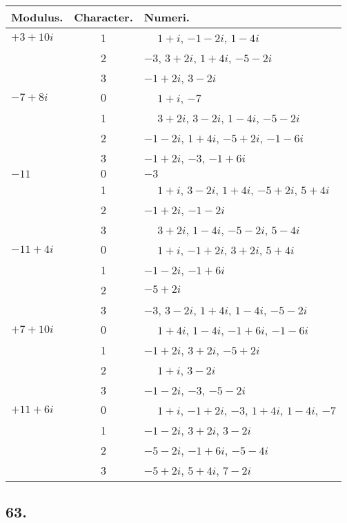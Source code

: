 \documentclass[twoside,12pt, showframe]{memoir}
\begin{document}
\begin{center}
\begin{tabular}{l|c|l}
Modulus. & Character. & Numeri. \\
\hline
\(+3+10 i\) & 1 & \(\phantom{+}1+i\), \(-1-2 i\), \(1-4 i\) \\
 & 2 & \(-3\), \(3+2 i\), \(1+4 i\), \(-5-2 i\) \\
 & 3 & \(-1+2 i\), \(3-2 i\) \\
\(-7+8 i\) & \(0\) & \(\phantom{+}1+i\), \(-7\) \\
 & 1 & \(\phantom{+}3+2 i\), \(3-2 i\), \(1-4 i\), \(-5-2 i\) \\
 & 2 & \(-1-2 i\), \(1+4 i\), \(-5+2 i\), \(-1-6 i\) \\
 & 3 & \(-1+2 i\), \(-3\), \(-1+6 i\) \\
\(-11\) & \(0\) & \(-3\) \\
 & 1 & \(\phantom{+}1+i\), \(3-2 i\), \(1+4 i\), \(-5+2 i\), \(5+4 i\) \\
 & 2 & \(-1+2 i\), \(-1-2 i\) \\
 & 3 & \(\phantom{+}3+2 i\), \(1-4 i\), \(-5-2 i\), \(5-4 i\) \\
\(-11+4 i\) & \(0\) & \(\phantom{+}1+i\), \(-1+2 i\), \(3+2 i\), \(5+4 i\) \\
 & 1 & \(-1-2 i\), \(-1+6 i\) \\
 & 2 & \(-5+2 i\) \\
 & 3 & \(-3\), \(3-2 i\), \(1+4 i\), \(1-4 i\), \(-5-2 i\) \\
\(+7+10 i\) & \(0\) & \(\phantom{+}1+4 i\), \(1-4 i\), \(-1+6 i\), \(-1-6 i\) \\
 & 1 & \(-1+2 i\), \(3+2 i\), \(-5+2 i\) \\
 & 2 & \(\phantom{+}1+i\), \(3-2 i\) \\
 & 3 & \(-1-2 i\), \(-3\), \(-5-2 i\) \\
\(+11+6 i\) & \(0\) & \(\phantom{+}1+i\), \(-1+2 i\), \(-3\), \(1+4 i\), \(1-4 i\), \(-7\) \\
 & 1 & \(-1-2 i\), \(3+2 i\), \(3-2 i\) \\
 & 2 & \(-5-2 i\), \(-1+6 i\), \(-5-4 i\) \\
 & 3 & \(-5+2 i\), \(5+4 i\), \(7-2 i\) \\
\end{tabular}
\end{center}

\subsection*{63.}
 
\end{document}
